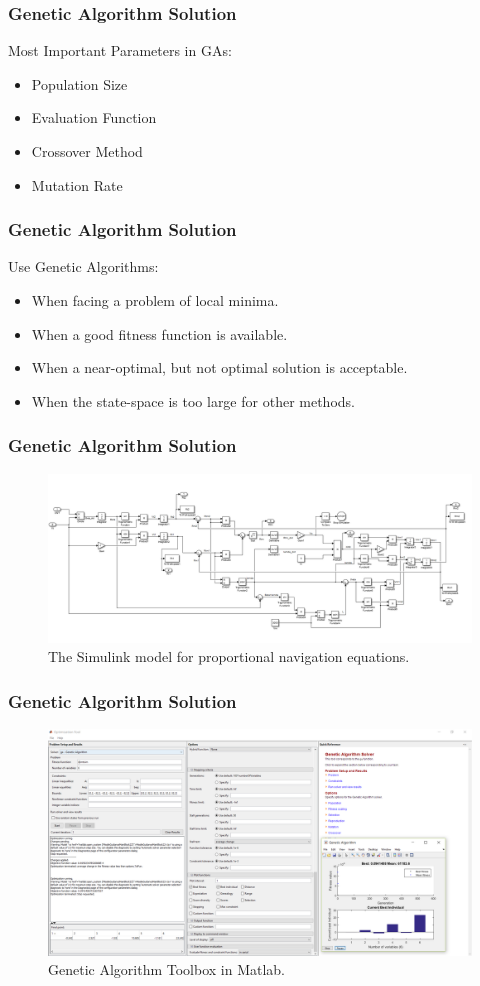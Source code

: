 \documentclass{beamer}
\begin{document}
\begin{frame}
\frametitle{Genetic Algorithm Solution}
Most Important Parameters in GAs:
\begin{itemize}
\item Population Size
\item Evaluation Function
\item Crossover Method
\item Mutation Rate
\end{itemize}
\end{frame}
\begin{frame}
\frametitle{Genetic Algorithm Solution}
Use Genetic Algorithms:
\begin{itemize}
\item When facing a problem of local minima.
\item When a good fitness function is available.
\item When a near-optimal, but not optimal solution is acceptable.
\item When the state-space is too large for other methods.
\end{itemize}
\end{frame}
\begin{frame}
\frametitle{Genetic Algorithm Solution}
\begin{figure}[H]
\centering
\includegraphics[scale = 0.3]{fig/PNeq.PNG}
\caption{The Simulink model for proportional navigation equations.}
\label{PN eq}
\end{figure}
\end{frame}
\begin{frame}
\frametitle{Genetic Algorithm Solution}
\begin{figure}[H]
\centering
\includegraphics[scale = 0.25]{fig/GApoly.PNG}
\caption{Genetic Algorithm Toolbox in Matlab.}
\label{GA toolbox poly}
\end{figure}
\end{frame}
\end{document}
